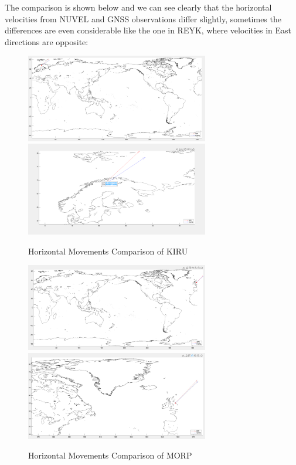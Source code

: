 \documentclass{article}
\begin{document}
The comparison is shown below 
and we can see clearly that the horizontal velocities from NUVEL and GNSS observations differ slightly, 
sometimes the differences are even considerable like the one in REYK, where velocities in East directions are opposite:
\begin{figure}[H]
  \centering
  {
  \includegraphics[width=8cm]{../result/KIRU/KIRU_4.jpg}}
  \hspace{3pt}    
  {
  \includegraphics[width=8cm]{../result/KIRU/KIRU_4(zoom_up).jpg}}
  \caption{Horizontal Movements Comparison of KIRU}
  \label{fig:Vel_KIRU}
  \end{figure}
  \begin{figure}[H]
    \centering
    {
    \includegraphics[width=8cm]{../result/MORP/MORP_4.jpg}}
    \hspace{3pt}    
    {
    \includegraphics[width=8cm]{../result/MORP/MORP_4(zoom_up).jpg}}
    \caption{Horizontal Movements Comparison of MORP}
    \label{fig:Vel_MORP}
  \end{figure}
\end{document}
